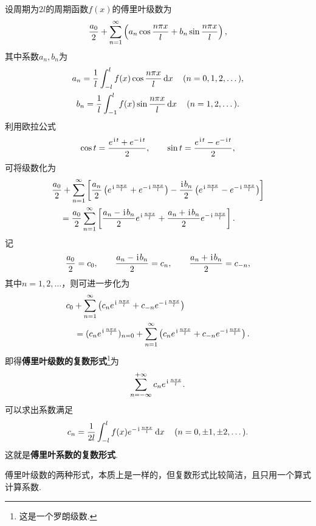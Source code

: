 设周期为\(2l\)的周期函数\(f(x)\)的傅里叶级数为\[
\frac{a_0}{2} + \s \left( a_n \cos\f + b_n \sin\f \right),
\]其中系数\(a_n,b_n\)为\begin{gather*}
a_n = \frac{1}{l} \int_{-l}^{l} f(x) \cos\f \dd{x} \quad (n=0,1,2,\dotsc), \\
b_n = \frac{1}{l} \int_{-1}^{l} f(x) \sin\f \dd{x} \quad (n=1,2,\dotsc).
\end{gather*}利用欧拉公式\[
\cos t = \frac{e^{\iu t}+e^{-\iu t}}{2},
\qquad
\sin t = \frac{e^{\iu t}-e^{-\iu t}}{2},
\]可将级数化为\[
\begin{split}
&\frac{a_0}{2} + \s \left[
	\frac{a_n}{2} \left( \eif{} + \eif- \right)
	-\frac{\iu b_n}{2} \left( \eif{} - \eif- \right)
\right] \\
&\hspace{10pt}= \frac{a_0}{2} \s \left[
	\frac{a_n - \iu b_n}{2} \eif{}
	+ \frac{a_n + \iu b_n}{2} \eif-
\right].
\end{split}
\]记\[
\frac{a_0}{2} = c_0,
\qquad
\frac{a_n-\iu b_n}{2} = c_n,
\qquad
\frac{a_n+\iu b_n}{2} = c_{-n},
\]其中\(n=1,2,\dotsc\)，则可进一步化为\[
\begin{split}
&c_0 + \s \left(
	c_n \eif{} + c_{-n} \eif-
\right) \\
&\hspace{10pt}= (c_n \eif{})_{n=0}
+ \s \left(
	c_n \eif{} + c_{-n} \eif-
\right).
\end{split}
\]即得\textbf{傅里叶级数的复数形式}\footnote{这是一个罗朗级数.}为
\begin{equation}\label{equation:无穷级数.傅里叶级数的复数形式}
\sum\limits_{n=-\infty}^{+\infty} c_n \eif{}.
\end{equation}可以求出系数满足
\begin{equation}\label{equation:无穷级数.傅里叶系数的复数形式}
c_n = \frac{1}{2l} \int_{-l}^l f(x) \eif- \dd{x}
\quad (n=0,\pm1,\pm2,\dotsc).
\end{equation}这就是\textbf{傅里叶系数的复数形式}.

傅里叶级数的两种形式，本质上是一样的，但复数形式比较简洁，且只用一个算式计算系数.

\endgroup
